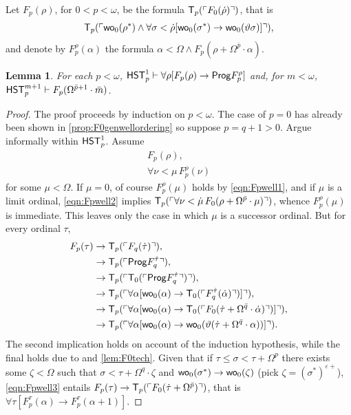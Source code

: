 \documentclass[UKenglish,cleveref,DIV=12]{scrartcl}
\newtheorem{lemma}[theorem]{Lemma}%
\theoremstyle{definition}
\theoremstyle{definition}
\newcommand{\gelnote}[1]{\note[magenta]{#1}}
\begin{document}
Let $F_p(\rho)$, for $0<p<\omega$, be the formula $\mathsf{T}_p(\ulcorner{F_0(\dot\rho)}\urcorner)$, that is
\begin{align*}
 \mathsf{T}_{p}(\ulcorner{\mathsf{wo}_0(\rho^*)\land\forall\sigma<\dot\rho [\mathsf{wo}_0(\sigma^*)\rightarrow\mathsf{wo}_0(\vartheta\sigma)]}\urcorner),
\end{align*}
and denote by $F_p^\rho(\alpha)$ the formula $\alpha<\Omega\land F_p(\rho+\Omega^{\bar p}\cdot\alpha)$.
\begin{lemma}\label{lem:Fpwellordering1}
 For each $p<\omega$, $\mathsf{HST}_p^1\vdash \forall\rho[F_p(\rho)\rightarrow\mathsf{Prog} F_p^{\rho}]$ and, for $m<\omega$, $\mathsf{HST}_p^{m+1}\vdash F_p(\Omega^{\bar p+1}\cdot\bar m)$.
\end{lemma}
\begin{proof} The proof proceeds by induction on $p<\omega$. The case of $p=0$
has already been shown in \cref{prop:F0genwellordering} so suppose $p=q+1>0$.
Argue informally within $\mathsf{HST}_p^1$. Assume
\begin{gather}
 F_p(\rho),\label{eqn:Fpwell1}\\
 \forall\nu<\mu\,F_p^\rho(\nu)\label{eqn:Fpwell2}
\end{gather}
for some $\mu<\Omega$. If $\mu=0$, of course $F_p^\rho(\mu)$ holds by
\eqref{eqn:Fpwell1}, and if $\mu$ is a limit ordinal, \eqref{eqn:Fpwell2}
implies $\mathsf{T}_p(\ulcorner{\forall\nu<\dot\mu\,F_0(\rho+\Omega^{\bar p}\cdot\mu)}\urcorner)$,
whence $F_p^\rho(\mu)$ is immediate. This leaves only the case in which $\mu$ is a
successor ordinal. But for every ordinal $\tau$,
\begin{align}\label{eqn:Fpwell3}
\begin{split}
  F_p(\tau) &\rightarrow \mathsf{T}_p(\ulcorner{F_q(\dot\tau)}\urcorner), \\
	  &\rightarrow \mathsf{T}_p(\ulcorner{\mathsf{Prog}F_q^{\dot\tau}}\urcorner),\\
	  &\rightarrow \mathsf{T}_p(\ulcorner{\mathsf{T}_0(\ulcorner{\mathsf{Prog}F_q^{\dot\tau}}\urcorner)}\urcorner),\\
	  &\rightarrow \mathsf{T}_p(\ulcorner{\forall\alpha[\mathsf{wo}_0(\alpha)\rightarrow \mathsf{T}_0(\ulcorner{F_q^{\dot\tau}(\dot\alpha)}\urcorner)]}\urcorner),\\
	  &\rightarrow \mathsf{T}_p(\ulcorner{\forall\alpha[\mathsf{wo}_0(\alpha)\rightarrow \mathsf{T}_0(\ulcorner{F_0(\dot\tau+\Omega^{\bar q}\cdot\dot\alpha)}\urcorner)]}\urcorner),\\
	  &\rightarrow \mathsf{T}_p(\ulcorner{\forall\alpha[\mathsf{wo}_0(\alpha)\rightarrow\mathsf{wo}_0(\vartheta(\dot\tau+\Omega^{\bar q}\cdot\alpha))]}\urcorner).
	  \end{split}
\end{align}
The second implication holds on account of the induction hypothesis, while the
final holds due to  and \cref{lem:F0tech}. Given that if
$\tau\le\sigma<\tau+\Omega^{p}$ there exists
some $\zeta<\Omega$ such that $\sigma<\tau+\Omega^q\cdot\zeta$ and
$\mathsf{wo}_0(\sigma^*)\rightarrow\mathsf{wo}_0(\zeta)$ (pick
$\zeta=(\sigma^*)^{\varepsilon+}$), \eqref{eqn:Fpwell3}\gelnote{define \( \alpha^{\varepsilon+} \)}
entails $F_p(\tau)\rightarrow\mathsf{T}_p(\ulcorner{F_0(\dot\tau+\Omega^{\bar p})}\urcorner)$,
that is $\forall\tau[F_p^\tau(\alpha)\rightarrow F_p^\tau(\alpha+1)]$.


\end{proof}
\end{document}
